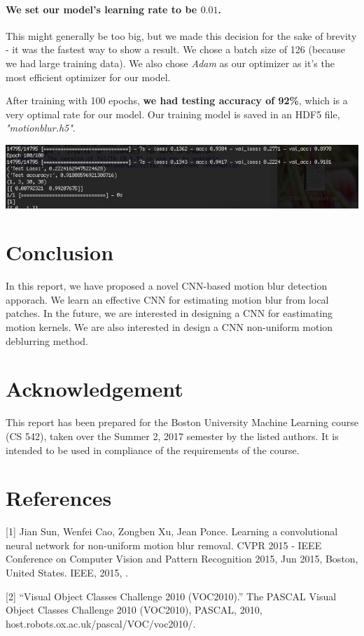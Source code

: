 \documentclass{article}
\begin{document}
\paragraph{We set our model's learning rate to be $0.01$.} This might generally be too 
big, but we made this decision for the sake of brevity - it was the fastest way to show 
a result. We chose a batch size of 126 (because we had large training data). We also 
chose \textit{Adam} as our optimizer as it's the most efficient optimizer for our model.

After training with 100 epochs, \textbf{we had testing accuracy of 92\%}, which is a 
very optimal rate for our model. Our training model is saved in an HDF5 file, 
\textit{"motionblur.h5"}.

\includegraphics[width=\textwidth]{accuracy} \\

\section{Conclusion}
In this report, we have proposed a novel CNN-based motion blur detection apporach. We 
learn an effective CNN for estimating motion blur from local patches. In the future, 
we are interested in designing a CNN for eastimating motion kernels. We are also interested 
in design a CNN non-uniform motion deblurring method.   

\section*{Acknowledgement}
This report has been prepared for the Boston University Machine Learning course (CS 542), 
taken over the Summer 2, 2017 semester by the listed authors. It is intended to be used 
in compliance of the requirements of the course. 

\section*{References}
\medskip
\small

[1] Jian Sun, Wenfei Cao, Zongben Xu, Jean Ponce. Learning a convolutional neural network 
for non-uniform motion blur removal. CVPR 2015 - IEEE Conference on Computer Vision and 
Pattern Recognition 2015, Jun 2015, Boston, United States. IEEE, 2015, .

[2] “Visual Object Classes Challenge 2010 (VOC2010).” The PASCAL Visual Object Classes 
Challenge 2010 (VOC2010), PASCAL, 2010, host.robots.ox.ac.uk/pascal/VOC/voc2010/.
\end{document}
